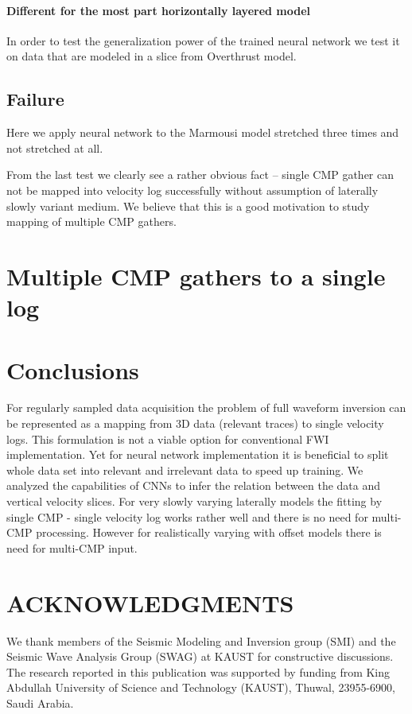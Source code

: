 \documentclass[manuscript]{geophysics}
\begin{document}
\paragraph{Different for the most part horizontally layered model}
In order to test the generalization power of the trained neural network we test it on data that are modeled in a slice from Overthrust model.


\subsection{Failure}
Here we apply neural network to the Marmousi model stretched three times and not stretched at all.

From the last test we clearly see a rather obvious fact -- single CMP gather can not be mapped into velocity log successfully without assumption of laterally slowly variant medium. We believe that this is a good motivation to study mapping of multiple CMP gathers.

\section{Multiple CMP gathers to a single log}

\section{Conclusions}
For regularly sampled data acquisition the problem of full waveform inversion can be represented as a mapping from 3D data (relevant traces) to single velocity logs. This formulation is not a viable option for conventional FWI implementation. Yet for neural network implementation it is benefiсial to split whole data set into relevant and irrelevant data to speed up training.  
We analyzed the capabilities of CNNs to infer the relation between the data and vertical velocity slices. For very slowly varying laterally models the fitting by single CMP - single velocity log works rather well and there is no need for multi-CMP processing. However for realistically varying with offset models there is need for multi-CMP input. 


\section{ACKNOWLEDGMENTS}

We thank members of the Seismic Modeling and Inversion group (SMI) and the Seismic Wave Analysis Group (SWAG) at KAUST for constructive discussions.
The research reported in this publication was supported by funding from King Abdullah University of Science and Technology (KAUST), Thuwal, 23955-6900, Saudi Arabia.




\newpage


\end{document}
